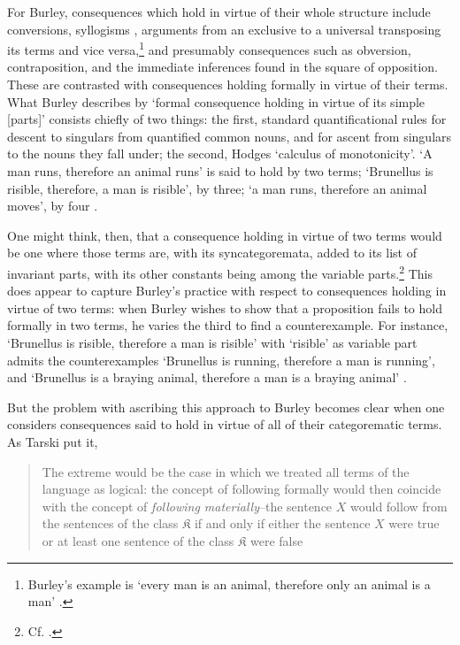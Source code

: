 \documentclass[]{birkjour}
\begin{document}
For Burley, consequences which hold in virtue of their whole structure include conversions, syllogisms \autocite[p. 86.9-12]{BurleyDPAL}, arguments from an exclusive to a universal transposing its terms and vice versa,\footnote{Burley's example is `every man is an animal, therefore only an animal is a man' \autocite[pp. 142-143, par. 118]{Green-Pedersen1980b}.} and presumably consequences such as obversion, contraposition, and the immediate inferences found in the square of opposition. These are contrasted with consequences holding formally in virtue of their terms. What Burley describes by `formal consequence holding in virtue of its simple [parts]' consists chiefly of two things: the first, standard quantificational rules for descent to singulars from quantified common nouns, and for ascent from singulars to the nouns they fall under; the second, Hodges `calculus of monotonicity'. `A man runs, therefore an animal runs' is said to hold by two terms; `Brunellus is risible, therefore, a man is risible', by three; `a man runs, therefore an animal moves', by four \autocite[p. 84.24-27]{BurleyDPAL}.

One might think, then, that a consequence holding in virtue of two terms would be one where those terms are, with its syncategoremata, added to its list of invariant parts, with its other constants being among the variable parts.\footnote{Cf. \autocite{George1986}.} This does appear to capture Burley's practice with respect to consequences holding in virtue of two terms: when Burley wishes to show that a proposition fails to hold formally in two terms, he varies the third to find a counterexample. For instance, `Brunellus is risible, therefore a man is risible' with `risible' as variable part admits the counterexamples `Brunellus is running, therefore a man is running', and `Brunellus is a braying animal, therefore a man is a braying animal' \autocite[84.13-15]{BurleyDPAL}. 

But the problem with ascribing this approach to Burley becomes clear when one considers consequences said to hold in virtue of all of their categorematic terms. As Tarski put it, 
\begin{quote}
	The extreme would be the case in which we treated all terms of the language as logical: the concept of following formally would then coincide with the concept of \textit{following materially}--the sentence $X$ would follow from the sentences of the class $\mathfrak{K}$ if and only if either the sentence $X$ were true or at least one sentence of the class $\mathfrak{K}$ were false \autocite[pp. 188-189]{Tarski2002}
\end{quote}
\end{document}
